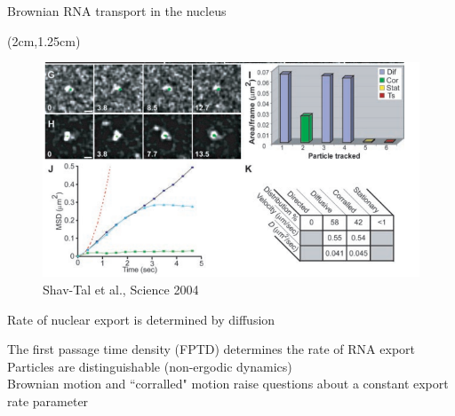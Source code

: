 \documentclass[aspectratio=1610]{beamer}					%
\begin{document}
\begin{frame}{Brownian RNA transport in the nucleus}

\begin{textblock*}{12cm}(2cm,1.25cm)
\begin{figure}
\includegraphics[width=12cm]{diffusion.png}
\caption{Shav-Tal et al., Science 2004}
\end{figure}
\end{textblock*}


\end{frame}

\begin{frame}{Rate of nuclear export is determined by diffusion}

The first passage time density (FPTD) determines the rate of RNA export\\
\vspace{0.1in}
Particles are distinguishable (non-ergodic dynamics) \\
\vspace{0.1in}
Brownian motion and ``corralled" motion raise questions about a constant export rate parameter

\end{frame}
\end{document}

